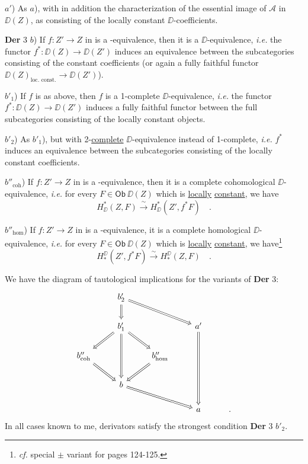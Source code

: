 $a'$) As $a$), with in addition the characterization of the essential image of $\mathcal{A}$ in $\DD(Z)$, as consisting of the locally constant $\DD$-coefficients. %

\textbf{Der} 3 $b$) If $f : Z' \to Z$ in \Dia{} is a \Hot-equivalence, then it is a $\DD$-equivalence, \textit{i.e.} the functor $f^{*} : \DD(Z) \to \DD(Z')$ induces an equivalence between the subcategories consisting of the constant coefficients (or again a fully faithful functor $\DD(Z)_{\text{loc. const.}} \longrightarrow \DD(Z')$).

$b'_1$) If $f$ is as above, then $f$ is a 1-complete $\DD$-equivalence, \textit{i.e.} the functor $f^{*} : \DD(Z) \to \DD(Z')$ induces a fully faithful functor
between the full subcategories consisting of the locally constant objects.

$b'_2$) As $b'_1$), but with 2-\underline{complete} $\DD$-equivalence instead of 1-complete, \textit{i.e.} $f^{*}$ induces an equivalence between the subcategories consisting of the locally constant coefficients.

$b''_{\mathrm{coh}}$) If $f : Z' \to Z$ in \Dia{} is a \Hot-equivalence, then it is a complete cohomological $\DD$-equivalence, \textit{i.e.} for every $F \in \mathsf{Ob}\ \DD(Z)$ which is \underline{locally} \underline{constant}, we have
\[ H^{*}_{\DD}(Z,F) \xrightarrow{\ \sim\ } H^{*}_{\DD}(Z',f^{*}F) \quad . \]

$b''_{\mathrm{hom}}$) If $f : Z' \to Z$ in \Dia{} is a \Hot-equivalence, it is a complete homological $\DD$-equivalence, \textit{i.e.} for every $F \in \mathsf{Ob}\ \DD(Z)$ which is \underline{locally} \underline{constant}, we have\footnote[59]{\textit{cf.} special $\pm$ variant for \HOT{} pages 124-125.}
\[ H_{*}^{\DD}(Z',f^{*}F) \xrightarrow{\ \sim\ } H_{*}^{\DD}(Z,F) \quad . \]


We have the diagram of tautological implications for the variants of \textbf{Der} 3:
\[
\begin{tikzcd}
 & b'_2 \arrow[d, Rightarrow] \arrow[drr, Rightarrow] & & & \\
 & b'_1 \arrow[dl, Rightarrow] \arrow[dr, Rightarrow] \arrow[dd, Rightarrow] & & a' \arrow[ddd, Rightarrow] & \\
b''_{\mathrm{coh}} \arrow[dr, Rightarrow] & & b''_{\mathrm{hom}} \arrow[dl, Rightarrow] & & \\
 & b \arrow[drr, Rightarrow] & & & \\
 & & & a & .
\end{tikzcd}
\]
In all cases known to me, derivators satisfy the strongest condition \textbf{Der} 3 $b'_2$.

